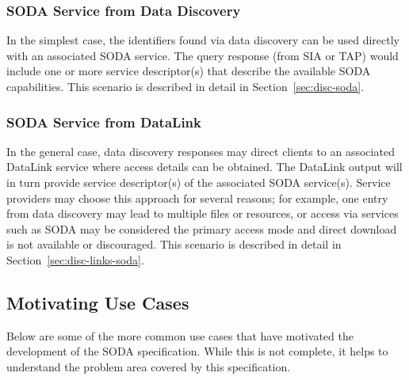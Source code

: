 \documentclass[11pt,a4paper]{ivoa}
\begin{document}
\subsubsection{SODA Service from Data Discovery}

In the simplest case, the identifiers found via data discovery can be
used directly with an associated SODA service. The query response (from
SIA or TAP) would include one or more service descriptor(s)
that describe the available SODA capabilities. This scenario is described
in detail in Section~\ref{sec:disc-soda}.

\subsubsection{SODA Service from DataLink}

In the general case, data discovery responses may direct clients to an
associated DataLink service where access details can be obtained. The
DataLink output will in turn provide service descriptor(s) of the
associated SODA service(s). Service providers may choose this approach
for several reasons; for example, one entry from data discovery may lead
to multiple files or resources, or access via services such as SODA may
be considered the primary access mode and direct download is not
available or discouraged. This scenario is described in detail in
Section~\ref{sec:disc-links-soda}.


\subsection{Motivating Use Cases}
Below are some of the more common use cases that have motivated the
development of the SODA specification. While this is not complete, it
helps to understand the problem area covered by this specification.
\end{document}
